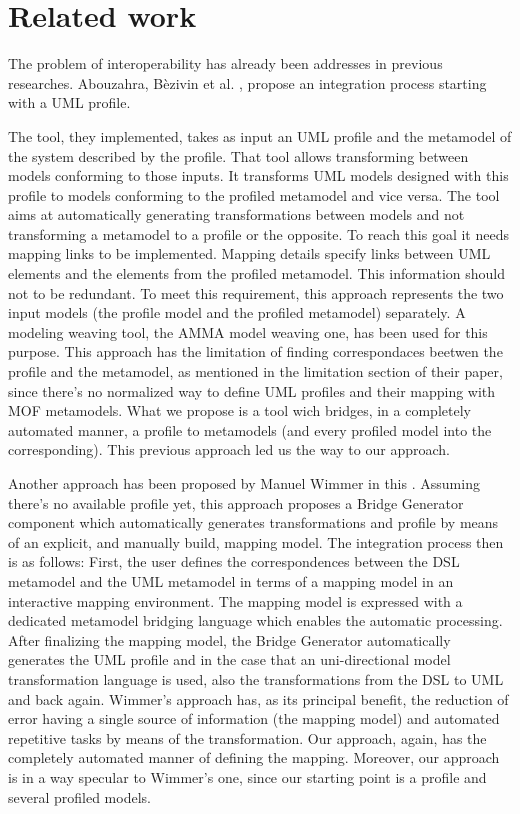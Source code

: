 \section{Related work}\label{sec:related}

The problem of interoperability has already been addresses in previous researches. Abouzahra, B\`ezivin et al. \cite{Abouzahra}, propose an integration process starting with a UML profile. 

The tool, they implemented, takes as input an UML profile and the metamodel of the system described by the profile. That tool allows
transforming between models conforming to those inputs. It transforms UML models designed with this profile to models conforming to the profiled metamodel and vice versa. The tool aims at automatically generating transformations between models and not transforming a metamodel to a profile or the opposite. To reach this goal it needs mapping links to be implemented. Mapping details specify links between UML elements and the elements from the profiled metamodel. This information should not to be redundant. To meet this requirement, this approach represents the two input models (the profile model and the profiled metamodel) separately. A modeling weaving tool, the AMMA model weaving one, has been used for this purpose. This approach has the limitation of finding correspondaces beetwen the profile and the metamodel, as mentioned in the limitation section of their paper, since there's no normalized way to define UML profiles and their mapping with MOF metamodels. What we propose is a tool wich bridges, in a completely automated manner, a profile to metamodels (and every profiled model into the corresponding). This previous approach led us the way to our approach.


Another approach has been proposed by Manuel Wimmer in this \cite{Wimmer}. Assuming there's no available profile yet, this approach proposes a Bridge Generator component which automatically generates transformations and profile by means of an explicit, and manually build, mapping model. The integration process then is as follows: First, the user defines the correspondences between the DSL metamodel and the UML metamodel in terms of a mapping model in an interactive mapping environment. The mapping model is expressed with a dedicated metamodel bridging language which enables the automatic processing. After finalizing the mapping model, the Bridge Generator automatically generates the UML profile and in the case that an uni-directional model transformation language is used, also the transformations from the DSL to UML and back again. Wimmer's approach has, as its principal benefit, the reduction of error having a single source of information (the mapping model) and automated repetitive tasks by means of the transformation. Our approach, again, has the completely automated manner of defining the mapping. Moreover, our approach is in a way specular to Wimmer's one, since our starting point is a profile and several profiled models.


